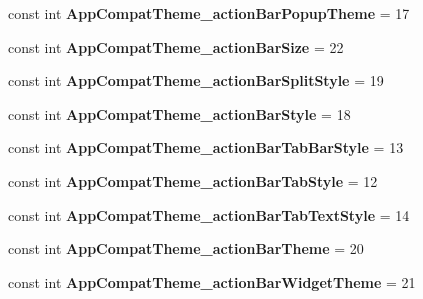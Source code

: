 \begin{DoxyCompactItemize}
\item 
\mbox{\label{classXaria_1_1Resource_1_1Styleable_a4e625916a8a9c367a84e2df1dcbdb557}} 
const int {\bfseries App\+Compat\+Theme\+\_\+action\+Bar\+Popup\+Theme} = 17
\item 
\mbox{\label{classXaria_1_1Resource_1_1Styleable_a06cabe55704fdf74b528ba27f8a2e1ed}} 
const int {\bfseries App\+Compat\+Theme\+\_\+action\+Bar\+Size} = 22
\item 
\mbox{\label{classXaria_1_1Resource_1_1Styleable_aa1484ab221a0c8e5a188ec92f25da14e}} 
const int {\bfseries App\+Compat\+Theme\+\_\+action\+Bar\+Split\+Style} = 19
\item 
\mbox{\label{classXaria_1_1Resource_1_1Styleable_ae5f12944c41667d570bffcabb86ef9ac}} 
const int {\bfseries App\+Compat\+Theme\+\_\+action\+Bar\+Style} = 18
\item 
\mbox{\label{classXaria_1_1Resource_1_1Styleable_a990c3fd524551a33842181574ecd2f48}} 
const int {\bfseries App\+Compat\+Theme\+\_\+action\+Bar\+Tab\+Bar\+Style} = 13
\item 
\mbox{\label{classXaria_1_1Resource_1_1Styleable_a538ac1b65839173377009c467e01bf94}} 
const int {\bfseries App\+Compat\+Theme\+\_\+action\+Bar\+Tab\+Style} = 12
\item 
\mbox{\label{classXaria_1_1Resource_1_1Styleable_a53712fd98f4ca30669b6e0161750a152}} 
const int {\bfseries App\+Compat\+Theme\+\_\+action\+Bar\+Tab\+Text\+Style} = 14
\item 
\mbox{\label{classXaria_1_1Resource_1_1Styleable_af01c3ca0a7db12bfecb33b34c09c509d}} 
const int {\bfseries App\+Compat\+Theme\+\_\+action\+Bar\+Theme} = 20
\item 
\mbox{\label{classXaria_1_1Resource_1_1Styleable_a66d22659813812b11f38cb8b6ffdb853}} 
const int {\bfseries App\+Compat\+Theme\+\_\+action\+Bar\+Widget\+Theme} = 21

\end{DoxyCompactItemize}
